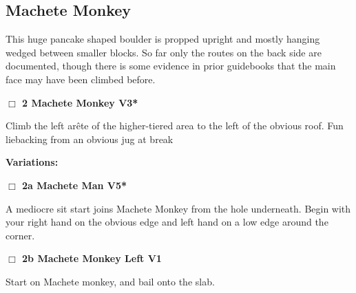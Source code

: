 \begin{multicols}{2}
\needspace{10em}
\subsection*{Machete Monkey}\label{bf:Machete Monkey}

This huge pancake shaped boulder is propped upright and mostly hanging wedged between smaller blocks. So far only the routes on the back side are documented, though there is some evidence in prior guidebooks that the main face may have been climbed before.\\



\needspace{2em}
\label{rt:Machete Monkey}
\colorbox{green!20}{
\parbox{0.95\linewidth}{
\hspace{-1ex}\textbf{$\Box$
2 Machete Monkey V3*  
}}}
\begin{adjustwidth}{1.3em}{}			

Climb the left arête of the higher-tiered area to the left of the obvious roof. Fun liebacking from an obvious jug at break
\end{adjustwidth}


\begin{adjustwidth}{0.5cm}{}				
\needspace{4em}
\textbf{Variations:} \newline

\needspace{2em}
\label{vr:Machete Man}
\colorbox{RoyalBlue!20}{
\parbox{0.95\linewidth}{
\hspace{-1ex}\textbf{$\Box$
2a Machete Man V5*  
}}}
\begin{adjustwidth}{1.3em}{}			

A mediocre sit start joins Machete Monkey from the hole underneath. Begin with your right hand on the obvious edge and left hand on a low edge around the corner.
\end{adjustwidth}




\needspace{2em}
\label{vr:Machete Monkey Left}
\colorbox{green!20}{
\parbox{0.95\linewidth}{
\hspace{-1ex}\textbf{$\Box$
2b Machete Monkey Left V1  
}}}
\begin{adjustwidth}{1.3em}{}			

Start on Machete monkey, and bail onto the slab.
\end{adjustwidth}



\end{adjustwidth}



\end{multicols}
